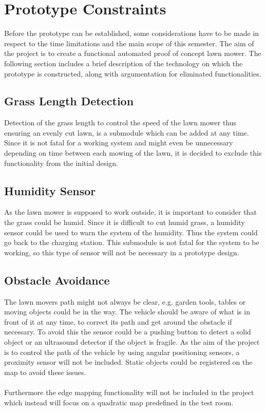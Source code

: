 \section{Prototype Constraints}\label{sec:PrototypeConstraints}
Before the prototype can be established, some considerations have to be made in respect to the time limitations and the main scope of this semester. The aim of the project is to create a functional automated proof of concept lawn mower. The following section includes a brief description of the technology on which the prototype is constructed, along with argumentation for eliminated functionalities.



\subsection{Grass Length Detection}
Detection of the grass length to control the speed of the lawn mower thus ensuring an evenly cut lawn, is a submodule which can be added at any time. Since it is not fatal for a working system and might even be unnecessary depending on time between each mowing of the lawn, it is decided to exclude this functionality from the initial design.

\subsection{Humidity Sensor}
As the lawn mower is supposed to work outside, it is important to consider that the grass could be humid. Since it is difficult to cut humid grass, a humidity sensor could be used to warn the system of the humidity. Thus the system could go back to the charging station. This submodule is not fatal for the system to be working, so this type of sensor will not be necessary in a prototype design.

\subsection{Obstacle Avoidance}
The lawn movers path might not always be clear, e.g. garden tools, tables or moving objects could be in the way. The vehicle should be aware of what is in front of it at any time, to correct its path and get around the obstacle if necessary. To avoid this the sensor could be a pushing button to detect a solid object or an ultrasound detector if the object is fragile.
As the aim of the project is to control the path of the vehicle by using angular positioning sensors, a proximity sensor will not be included. Static objects could be registered on the map to avoid these issues.\\\\
Furthermore the edge mapping functionality will not be included in the project which instead will focus on a quadratic map predefined in the test room.

